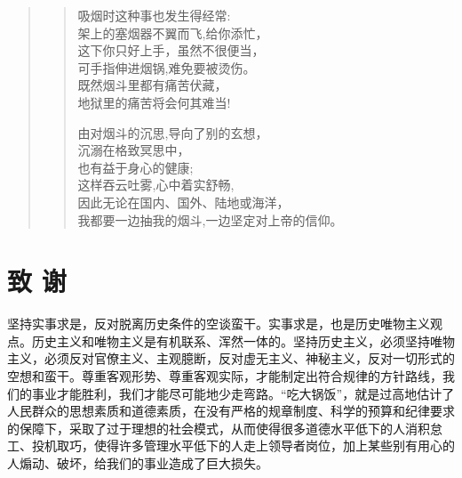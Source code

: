 \documentclass[openany,oneside]{book}
\theoremstyle{cthmstyle}
\theoremstyle{definition}
\theoremstyle{remark}
\begin{document}
\begin{quote}
\begin{verse}
        吸烟时这种事也发生得经常:\\
        \hspace{1em}架上的塞烟器不翼而飞,给你添忙，\\
        这下你只好上手，虽然不很便当，\\
        \hspace{1em}可手指伸进烟锅,难免要被烫伤。\\
        \hspace{2em}既然烟斗里都有痛苦伏藏，\\
        \hspace{2em}地狱里的痛苦将会何其难当!\\
        \vspace{1em}
        
        由对烟斗的沉思,导向了别的玄想，\\
        \hspace{1em}沉溺在格致冥思中，\\
        也有益于身心的健康;\\
        \hspace{1em}这样吞云吐雾,心中着实舒畅,\\
        \hspace{2em}因此无论在国内、国外、陆地或海洋，\\
        \hspace{2em}我都要一边抽我的烟斗,一边坚定对上帝的信仰。\\
    \end{verse}
\end{quote}

\clearpage
{}
\chapter*{致 \qquad 谢}
\rule{0pt}{0pt}\par %
坚持实事求是，反对脱离历史条件的空谈蛮干。实事求是，也是历史唯物主义观点。历史主义和唯物主义是有机联系、浑然一体的。坚持历史主义，必须坚持唯物主义，必须反对官僚主义、主观臆断，反对虚无主义、神秘主义，反对一切形式的空想和蛮干。尊重客观形势、尊重客观实际，才能制定出符合规律的方针路线，我们的事业才能胜利，我们才能尽可能地少走弯路。“吃大锅饭”，就是过高地估计了人民群众的思想素质和道德素质，在没有严格的规章制度、科学的预算和纪律要求的保障下，采取了过于理想的社会模式，从而使得很多道德水平低下的人消积怠工、投机取巧，使得许多管理水平低下的人走上领导者岗位，加上某些别有用心的人煽动、破坏，给我们的事业造成了巨大损失。
\end{document}
